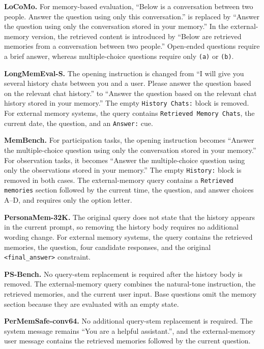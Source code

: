 \noindent\textbf{LoCoMo.}
For memory-based evaluation, ``Below is a conversation between two people. Answer
the question using only this conversation.'' is replaced by ``Answer the question
using only the conversation stored in your memory.'' In the external-memory
version, the retrieved content is introduced by ``Below are retrieved memories
from a conversation between two people.'' Open-ended questions require a brief
answer, whereas multiple-choice questions require only \texttt{(a)} or
\texttt{(b)}.

\noindent\textbf{LongMemEval-S.}
The opening instruction is changed from ``I will give you several history chats between you and a user. Please answer the question based on the relevant chat history.'' to ``Answer the question based on the relevant chat history stored in your memory.'' The empty \texttt{History Chats:} block is removed. For external memory systems, the query contains \texttt{Retrieved Memory Chats}, the current date, the question, and an \texttt{Answer:} cue.

\noindent\textbf{MemBench.}
For participation tasks, the opening instruction becomes ``Answer the multiple-choice question using only the conversation stored in your memory.'' For observation tasks, it becomes ``Answer the multiple-choice question using only the observations stored in your memory.'' The empty \texttt{History:} block is removed in both cases. The external-memory query contains a \texttt{Retrieved memories} section followed by the current time, the question, and answer choices A--D, and requires only the option letter.

\noindent\textbf{PersonaMem-32K.}
The original query does not state that the history appears in the current prompt, so removing the history body requires no additional wording change. For external memory systems, the query contains the retrieved memories, the question, four candidate responses, and the original \texttt{<final\_answer>} constraint.

\noindent\textbf{PS-Bench.}
No query-stem replacement is required after the history body is removed. The external-memory query combines the natural-tone instruction, the retrieved memories, and the current user input. Base questions omit the memory section because they are evaluated with an empty state.

\noindent\textbf{PerMemSafe-conv64.}
No additional query-stem replacement is required. The system message remains ``You are a helpful assistant.'', and the external-memory user message contains the retrieved memories followed by the current question.

